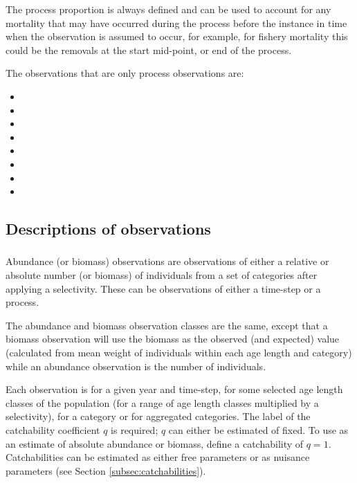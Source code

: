The process proportion is always defined and can be used to account for any mortality that may have occurred during the process before the instance in time when the observation is assumed to occur, for example, for fishery mortality this could be the removals at the start mid-point, or end of the process.

\ifAgeBased
The observations that are only process observations are:
\begin{itemize}
	\item {}
	\item {}
	\item {}
	\item {}
	\item {}
	\item {}
	\item {}
    \item {}
\end{itemize}
\fi

\subsection{Descriptions of observations}

\subsubsection{} \label{sec:Observation-Abundance} \label{sec:Observation-Biomass}

Abundance (or biomass) observations are observations of either a relative or absolute number (or biomass) of individuals from a set of categories after applying a selectivity. These can be observations of either a time-step or a process. 

The abundance and biomass observation classes are the same, except that a biomass observation will use the biomass as the observed (and expected) value (calculated from mean weight of individuals within each \ifAgeBased age \else length \fi and category) while an abundance observation is the number of individuals.

Each observation is for a given year and time-step, for some selected \ifAgeBased age \else length \fi classes of the population (for a range of \ifAgeBased age \else length \fi classes multiplied by a selectivity), for a category or for aggregated categories. The label of the catchability coefficient $q$ is required;  $q$ can either be estimated of fixed. To use as an estimate of absolute abundance or biomass, define a catchability of $q=1$. Catchabilities can be estimated as either free parameters or as nuisance parameters (see Section \ref{subsec:catchabilities}).

